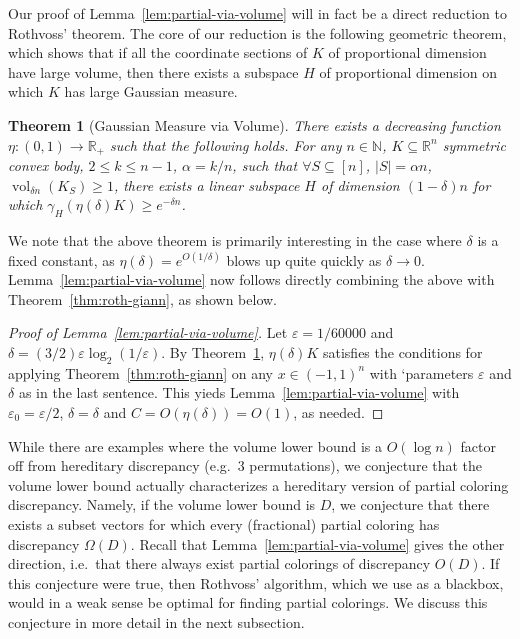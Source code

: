 \documentclass[12pt]{article}
\newtheorem{theorem}{Theorem}
\newcommand{\R}{{\mathbb{R}}}
\newcommand{\N}{{\mathbb{N}}}
\newcommand\eps{\varepsilon}
\DeclareMathOperator{\vol}{vol}
\begin{document}
Our proof of Lemma~\ref{lem:partial-via-volume} will in fact be a direct
reduction to Rothvoss' theorem. The core of our reduction is the following
geometric theorem, which shows that if all the coordinate sections of $K$ of
proportional dimension have large volume, then there exists a subspace $H$ of
proportional dimension on which $K$ has large Gaussian measure. 

\begin{theorem}[Gaussian Measure via Volume]
\label{thm:gauss-via-volume}
There exists a decreasing function $\eta: (0,1) \rightarrow \R_+$ such that the
following holds. For any $n \in \N$, $K \subseteq \R^n$ symmetric convex body,
$2 \leq k \leq n-1$, $\alpha = k/n$, such that $\forall S \subseteq [n]$,
$|S| = \alpha n$, $\vol_{\delta n}(K_S) \geq 1$, there exists a linear
subspace $H$ of dimension $(1-\delta)n$ for which $\gamma_H(\eta(\delta) K) \geq
e^{-\delta n}$.
\end{theorem}

We note that the above theorem is primarily interesting in the case where
$\delta$ is a fixed constant, as $\eta(\delta) = e^{O(1/\delta)}$ blows up quite
quickly as $\delta \rightarrow 0$. Lemma~\ref{lem:partial-via-volume} now
follows directly combining the above with Theorem~\ref{thm:roth-giann}, as shown
below.

\begin{proof}[Proof of Lemma~\ref{lem:partial-via-volume}] 
Let $\eps = 1/60000$ and $\delta = (3/2) \eps \log_2(1/\eps)$. By
Theorem~\ref{thm:gauss-via-volume}, $\eta(\delta) K$ satisfies the conditions
for applying Theorem~\ref{thm:roth-giann} on any $x \in (-1,1)^n$ with
`parameters $\eps$ and $\delta$ as in the last sentence. This yieds
Lemma~\ref{lem:partial-via-volume} with $\eps_0 = \eps/2$, $\delta = \delta$ and
$C = O(\eta(\delta)) = O(1)$, as needed.   
\end{proof}

While there are examples where the volume lower bound is a $O(\log n)$ factor
off from hereditary discrepancy (e.g.~$3$ permutations), we conjecture that the
volume lower bound actually characterizes a hereditary version of partial
coloring discrepancy. Namely, if the volume lower bound is $D$, we conjecture
that there exists a subset vectors for which every (fractional) partial coloring
has discrepancy $\Omega(D)$. Recall that Lemma~\ref{lem:partial-via-volume}
gives the other direction, i.e.~that there always exist partial colorings of
discrepancy $O(D)$. If this conjecture were true, then Rothvoss' algorithm,
which we use as a blackbox, would in a weak sense be optimal for finding
partial colorings. We discuss this conjecture in more detail in the next
subsection. 
\end{document}
